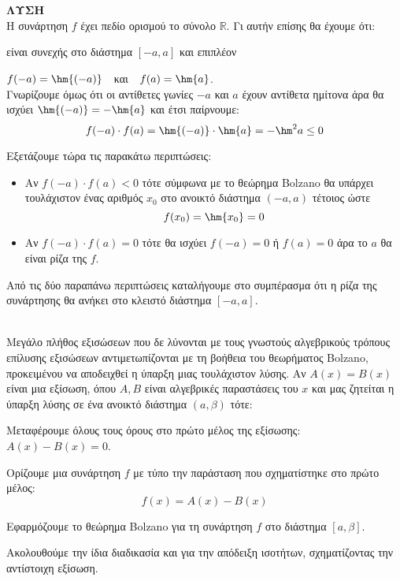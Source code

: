 \documentclass[twoside,nofonts,ektypwsh]{frontisthrio}
\begin{document}
\noindent
{}
\\\\
\textbf{ΛΥΣΗ}\\
Η συνάρτηση $ f $ έχει πεδίο ορισμού το σύνολο $ \mathbb{R} $. Γι αυτήν επίσης θα έχουμε ότι:
\begin{rlist}
\item είναι συνεχής στο διάστημα $ [-a,a] $ και επιπλέον
\item $ f(-a)=\hm{(-a)} $\ \ και\ \ 
$ f(a)=\hm{a} $.\\
Γνωρίζουμε όμως ότι οι αντίθετες γωνίες $ -a $ και $ a $ έχουν αντίθετα ημίτονα άρα θα ισχύει $ \hm{(-a)}=-\hm{a} $ και έτσι παίρνουμε:
\[ f(-a)\cdot f(a)=\hm{(-a)}\cdot\hm{a}=-\hm^2{a}\leq0 \]
\end{rlist}
Εξετάζουμε τώρα τις παρακάτω περιπτώσεις:
\begin{itemize}
\item Αν $ f(-a)\cdot f(a)<0 $ τότε σύμφωνα με το θεώρημα Bolzano θα υπάρχει τουλάχιστον ένας αριθμός $ x_0 $ στο ανοικτό διάστημα $ (-a,a) $ τέτοιος ώστε
\[ f(x_0)=\hm{x_0}=0 \]
\item Αν $ f(-a)\cdot f(a)=0 $ τότε θα ισχύει $ f(-a)=0 $ ή $ f(a)=0 $ άρα το $ a $ θα είναι ρίζα της $ f $.
\end{itemize}
Από τις δύο παραπάνω περιπτώσεις καταλήγουμε στο συμπέρασμα ότι η ρίζα της συνάρτησης θα ανήκει στο κλειστό διάστημα $ [-a,a] $.\\\\
\begin{Methodos}[Ύπαρξη λύσης εξίσωσης]{8cm}\label{bol:ex}
Μεγάλο πλήθος εξισώσεων που δε λύνονται με τους γνωστούς αλγεβρικούς τρόπους επίλυσης εξισώσεων αντιμετωπίζονται με τη βοήθεια του θεωρήματος Bolzano, προκειμένου να αποδειχθεί η ύπαρξη μιας τουλάχιστον λύσης. Αν $ A(x)=B(x) $ είναι μια εξίσωση, όπου $ A,B $ είναι αλγεβρικές παραστάσεις του $ x $ και μας ζητείται η ύπαρξη λύσης σε ένα ανοικτό διάστημα $ (a,\beta) $ τότε:
\begin{bhma}
\item Μεταφέρουμε όλους τους όρους στο πρώτο μέλος της εξίσωσης: $ A(x)-B(x)=0 $.
\item Ορίζουμε μια συνάρτηση $ f $ με τύπο την παράσταση που σχηματίστηκε στο πρώτο μέλος: \[ f(x)=A(x)-B(x) \]
\item Εφαρμόζουμε το θεώρημα Bolzano για τη συνάρτηση $ f $ στο διάστημα $ [a,\beta] $.
\end{bhma}
Ακολουθούμε την ίδια διαδικασία και για την απόδειξη ισοτήτων, σχηματίζοντας την αντίστοιχη εξίσωση.
\end{Methodos}
\end{document}
